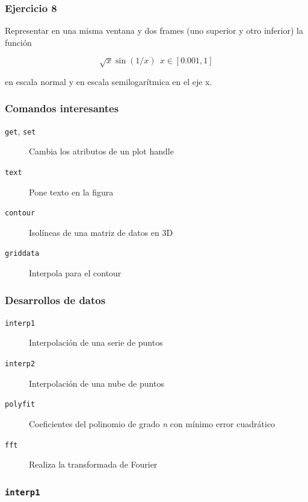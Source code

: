 \documentclass[12pt]{beamer}
\begin{document}
\begin{large}
\begin{frame}
\frametitle{Ejercicio 8}

Representar en una misma ventana y dos frames (uno superior y otro
inferior) la función

\[ \sqrt{x} \sin(1/x)\ \ x \in[0.001,1]  \]

en escala normal y en escala semilogarítmica en el eje x.
\end{frame}

\begin{frame}
\frametitle{Comandos interesantes}
\begin{description}
\item[\texttt{get}, \texttt{set}] Cambia los atributos de un plot
  handle
\item[\texttt{text}] Pone texto en la figura
\item[\texttt{contour}] Isolíneas de una matriz de datos en 3D
\item[\texttt{griddata}] Interpola para el contour
\end{description}
\end{frame}

\begin{frame}
\frametitle{Desarrollos de datos}
\begin{description}
\item[\texttt{interp1}] Interpolación de una serie de puntos
\item[\texttt{interp2}] Interpolación de una nube de puntos
\item[\texttt{polyfit}] Coeficientes del polinomio de grado \emph{n}
  con mínimo error cuadrático
\item[\texttt{fft}] Realiza la transformada de Fourier
\end{description}
\end{frame}



\begin{frame}
\frametitle{\texttt{interp1}}
\testcode
\end{frame}



\end{large}
\end{document}
